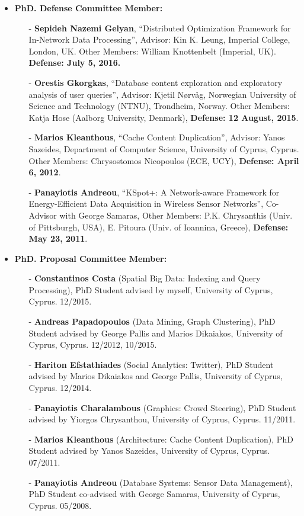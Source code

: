 \documentclass[10pt]{article}
\begin{document}
\begin{itemize}
    \item {\bf PhD. Defense Committee Member:}
    \begin{itemize}
    \setlength{\itemsep}{0.10ex}
        \item[-] {\bf Sepideh Nazemi Gelyan}, ``Distributed Optimization Framework for In-Network Data Processing'', Advisor: Kin K. Leung, Imperial College, London, UK. Other Members: William Knottenbelt (Imperial, UK). {\bf Defense: July 5, 2016.}
        \item[-] {\bf Orestis Gkorgkas}, ``Database content exploration and exploratory analysis of user queries'', Advisor: Kjetil N{\o}rv{\aa}g, Norwegian University of Science and Technology (NTNU), Trondheim, Norway. Other Members: Katja Hose (Aalborg University, Denmark), {\bf Defense: 12 August, 2015}.
        \item[-] {\bf Marios Kleanthous}, ``Cache Content Duplication'', Advisor: Yanos Sazeides, Department of Computer Science, University of Cyprus, Cyprus. Other Members: Chrysostomos Nicopoulos (ECE, UCY), {\bf Defense: April 6, 2012}.
        \item[-] {\bf Panayiotis Andreou}, ``KSpot+: A Network-aware Framework for Energy-Efficient Data Acquisition in Wireless Sensor Networks'', Co-Advisor with George Samaras, Other Members: P.K. Chrysanthis (Univ. of Pittsburgh, USA), E. Pitoura (Univ. of Ioannina, Greece),  {\bf Defense: May 23, 2011}.
    \end{itemize}

    \item {\bf PhD. Proposal Committee Member:}
    \begin{itemize}
    \setlength{\itemsep}{0.10ex}
        \item[-] {\bf Constantinos Costa} (Spatial Big Data: Indexing and Query Processing), PhD Student advised by myself, University of Cyprus, Cyprus. 12/2015.
        \item[-] {\bf Andreas Papadopoulos} (Data Mining, Graph Clustering), PhD Student advised by George Pallis and Marios Dikaiakos, University of Cyprus, Cyprus. 12/2012, 10/2015.
        \item[-] {\bf Hariton Efstathiades} (Social Analytics: Twitter), PhD Student advised by Marios Dikaiakos and George Pallis, University of Cyprus, Cyprus. 12/2014.
        \item[-] {\bf Panayiotis Charalambous} (Graphics: Crowd Steering), PhD Student advised by Yiorgos Chrysanthou, University of Cyprus, Cyprus. 11/2011.
        \item[-] {\bf Marios Kleanthous} (Architecture: Cache Content Duplication), PhD Student advised by Yanos Sazeides, University of Cyprus, Cyprus. 07/2011.
        \item[-] {\bf Panayiotis Andreou} (Database Systems: Sensor Data Management), PhD Student co-advised with George Samaras, University of Cyprus, Cyprus. 05/2008.
        \end{itemize}


\end{itemize}
\end{document}
